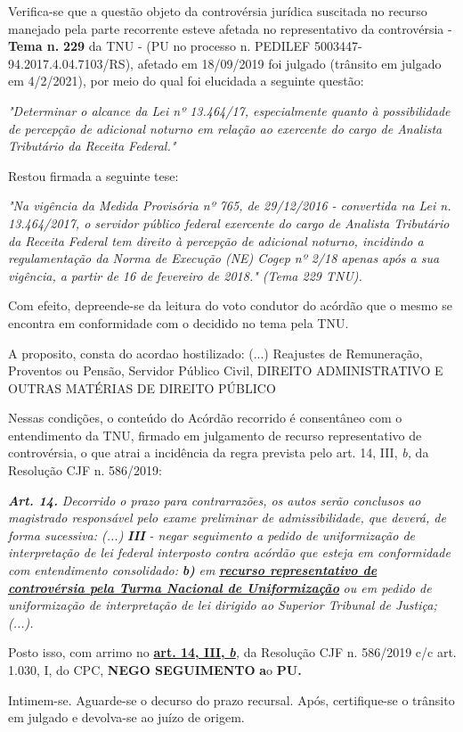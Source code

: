 \documentclass[12pt]{article}
\begin{document}
\justifying
\noindent Verifica-se que a questão objeto da controvérsia jurídica suscitada no recurso manejado pela parte recorrente esteve afetada no representativo da controvérsia - \textbf{Tema n. }\textbf{229} da TNU - (PU no processo n. PEDILEF 5003447-94.2017.4.04.7103/RS),  afetado em 18/09/2019 foi julgado (trânsito em julgado em 4/2/2021), por meio do qual foi elucidada a seguinte questão:

\noindent \textit{"Determinar o alcance da Lei nº 13.464/17, especialmente quanto à possibilidade de percepção de adicional noturno em relação ao exercente do cargo de Analista Tributário da Receita Federal."}

\noindent Restou firmada a seguinte tese:

\noindent \textit{"Na vigência da Medida Provisória nº 765, de 29/12/2016 - convertida na Lei n. 13.464/2017, o servidor público federal exercente do cargo de Analista Tributário da Receita Federal tem direito à percepção de adicional noturno, incidindo a regulamentação da Norma de Execução (NE) Cogep nº 2/18 apenas após a sua vigência, a partir de 16 de fevereiro de 2018." (Tema 229 TNU).}

\noindent Com efeito, depreende-se da leitura do voto condutor do acórdão que o mesmo se encontra em conformidade com o decidido no  tema pela TNU.

\noindent A proposito, consta do acordao hostilizado: (...) Reajustes de Remuneração, Proventos ou Pensão, Servidor Público Civil, DIREITO ADMINISTRATIVO E OUTRAS MATÉRIAS DE DIREITO PÚBLICO

\noindent Nessas condições, o conteúdo do Acórdão recorrido é consentâneo com o entendimento da TNU, firmado em julgamento de recurso representativo de controvérsia, o que atrai a incidência da regra prevista pelo art. 14, III, \textit{b,} da Resolução CJF n. 586/2019:

\noindent \textit{\textbf{Art. 14.}}\textit{ Decorrido o prazo para contrarrazões, os autos serão conclusos ao magistrado responsável pelo exame preliminar de admissibilidade, que deverá, de forma sucessiva: (...) }\textit{\textbf{III }}\textit{- negar seguimento a pedido de uniformização de interpretação de lei federal interposto contra acórdão que esteja em conformidade com entendimento consolidado: }\textit{\textbf{b)}}\textit{ em }\uline{\textit{\textbf{recurso representativo de controvérsia pela Turma Nacional de Uniformização}}}\textit{ ou em pedido de uniformização de interpretação de lei dirigido ao Superior Tribunal de Justiça;(...).}

\noindent Posto isso, com arrimo no \uline{\textbf{art. 14, III, }}\uline{\textit{\textbf{b}}}\textit{,} da Resolução CJF n. 586/2019 c/c art. 1.030, I, do CPC, \textbf{NEGO SEGUIMENTO }\textbf{a}o\textbf{ PU}\textbf{.}

\noindent Intimem-se. Aguarde-se o decurso do prazo recursal. Após, certifique-se o trânsito em julgado e devolva-se ao juízo de origem.
\end{document}
